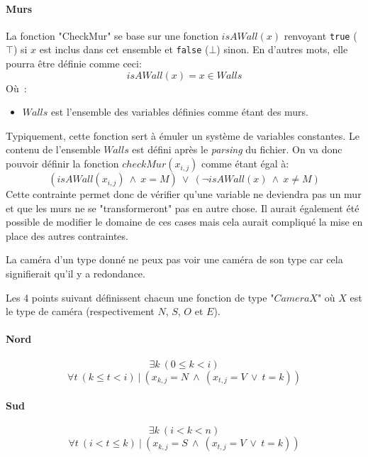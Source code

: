 \documentclass[a4paper,11pt]{article}
\newcommand{\AND}{~\wedge~}
\newcommand{\OR}{~\vee~}
\newcommand{\TQ}{~|~}
\begin{document}
          \paragraph{Murs}
          	  La fonction "CheckMur" se base sur une fonction $isAWall(x)$ renvoyant \verb|true| ($\top$) si $x$ est inclus dans cet ensemble et \verb|false| ($\bot$) sinon.  En d'autres mots, elle pourra être définie comme ceci:
          	  \[isAWall(x) = x \in Walls\]
              Où~:
              \begin{itemize}
              	\item $Walls$ est l'ensemble des variables définies comme étant des murs.
              \end{itemize}
              Typiquement, cette fonction sert à émuler un système de variables constantes. Le contenu de l'ensemble $Walls$ est défini après le \textit{parsing} du fichier. On va donc pouvoir définir la fonction $checkMur(x_{i, j})$ comme étant égal à:
              \[(isAWall(x_{i, j}) \AND x = M) \OR (\neg isAWall(x) \AND x \neq M) \]
              Cette contrainte permet donc de vérifier qu'une variable ne deviendra pas un mur et que les murs ne se "transformeront" pas en autre chose.  Il aurait également été possible de modifier le domaine de ces cases mais cela aurait compliqué la mise en place des autres contraintes.\\
              
          \begin{tcolorbox}[title= Remarque~:]
          	La caméra d'un type donné ne peux pas voir une caméra de son type car cela signifierait qu'il y a redondance.
          \end{tcolorbox}
			
            Les 4 points suivant définissent chacun une fonction de type "$CameraX$" où $X$ est le type de caméra (respectivement $N$, $S$, $O$ et $E$).
          \paragraph{Nord}
              \[ \exists k~(0 \leq k < i) \]
              \[ \forall t~(k \leq t < i) \TQ (x_{k, j} = N \AND (x_{t, j} = V \OR t = k)) \]

          \paragraph{Sud}
              \[ \exists k~(i < k < n) \]
              \[ \forall t~(i < t \leq k) \TQ (x_{k, j} = S \AND (x_{t, j} = V \OR t = k)) \]
\end{document}
